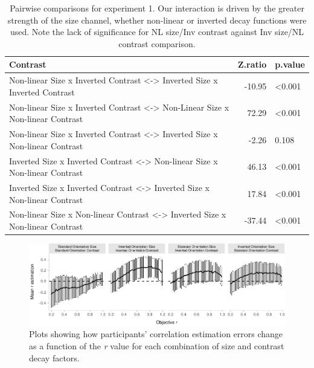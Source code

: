 \documentclass[manuscript, review, anonymous, screen]{acmart}
\begin{document}
\hypertarget{tbl-contrasts}{}
\begin{table}
\caption{\label{tbl-contrasts}Pairwise comparisons for experiment 1. Our interaction is driven by the
greater strength of the size channel, whether non-linear or inverted
decay functions were used. Note the lack of significance for NL size/Inv
contrast against Inv size/NL contrast comparison. }\tabularnewline

\centering
\begin{tabular}{lrl}
\toprule
Contrast & Z.ratio & p.value\\
\midrule
Non-linear Size x Inverted Contrast <-> Inverted Size x Inverted Contrast & -10.95 & <0.001\\
Non-linear Size x Inverted Contrast <-> Non-Linear Size x Non-linear Contrast & 72.29 & <0.001\\
Non-linear Size x Inverted Contrast <-> Inverted Size x Non-linear Contrast & -2.26 & 0.108\\
Inverted Size x Inverted Contrast <-> Non-linear Size x Non-linear Contrast & 46.13 & <0.001\\
Inverted Size x Inverted Contrast <-> Inverted Size x Non-linear Contrast & 17.84 & <0.001\\
\addlinespace
Non-linear Size x Non-linear Contrast <-> Inverted Size x Non-linear Contrast & -37.44 & <0.001\\
\bottomrule
\end{tabular}
\end{table}

\begin{figure}

{\centering \includegraphics[width=1\textwidth,height=\textheight]{size_and_contrast_new_files/figure-pdf/fig-diff-error-bars-plot-1.pdf}

}

\caption{\label{fig-diff-error-bars-plot}Plots showing how participants'
correlation estimation errors change as a function of the \emph{r} value
for each combination of size and contrast decay factors.}

\end{figure}
\end{document}

